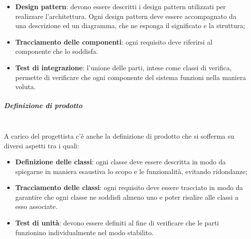 \begin{itemize}
\begin{itemize}
	\item \textbf{Design pattern}: devono essere descritti i design pattern utilizzati per realizzare l'architettura. Ogni design pattern deve essere accompagnato da una descrizione ed un diagramma, che ne esponga il significato e la struttura;
	\item \textbf{Tracciamento delle componenti}: ogni requisito deve riferirsi al componente che lo soddisfa.
	\item \textbf{Test di integrazione}: l'unione delle parti, intese come classi di verifica, permette di verificare che ogni componente del sistema funzioni nella maniera voluta.
\end{itemize}
\subparagraph{Definizione di prodotto} \mbox{}\\
A carico del progettista c'è anche la definizione di prodotto che si sofferma su diversi aspetti tra i quali:
\begin{itemize}
	\item \textbf{Definizione delle classi}: ogni classe deve essere descritta in modo da spiegarne in maniera esaustiva lo scopo e le funzionalità, evitando ridondanze;
	\item \textbf{Tracciamento delle classi}: ogni requisito deve essere tracciato in modo da garantire che ogni classe ne soddisfi almeno uno e poter risalire alle classi a esso associate.
	\item \textbf{Test di unità}: devono essere definiti al fine di verificare che le parti funzionino individualmente nel modo stabilito.
\end{itemize}

\end{itemize}
